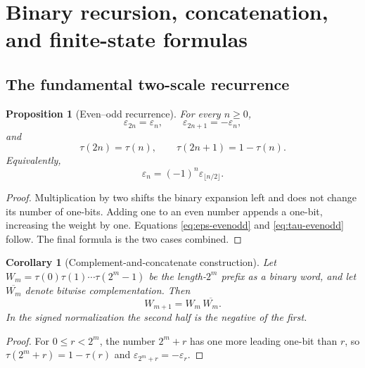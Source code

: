 \documentclass[11pt,oneside]{article}
\newtheorem{proposition}[theorem]{Proposition}
\newtheorem{corollary}[theorem]{Corollary}
\theoremstyle{definition}
\theoremstyle{remark}
\newcommand{\eps}{\varepsilon}
\newcommand{\1}{\mathbf 1}
\begin{document}
\section{Binary recursion, concatenation, and finite-state formulas}
\label{sec:binary}

\subsection{The fundamental two-scale recurrence}

\begin{proposition}[Even--odd recurrence]
\label{prop:evenodd}
For every \(n\ge0\),
\begin{equation}
 \eps_{2n}=\eps_n,
 \qquad
 \eps_{2n+1}=-\eps_n,
 \label{eq:eps-evenodd}
\end{equation}
and
\begin{equation}
 \tau(2n)=\tau(n),
 \qquad
 \tau(2n+1)=1-\tau(n).
 \label{eq:tau-evenodd}
\end{equation}
Equivalently,
\begin{equation}
 \eps_n=(-1)^n\eps_{\lfloor n/2\rfloor}.
 \label{eq:one-line-recursion}
\end{equation}
\end{proposition}

\begin{proof}
Multiplication by two shifts the binary expansion left and does not change its number of
one-bits.  Adding one to an even number appends a one-bit, increasing the weight by one.
Equations \eqref{eq:eps-evenodd} and \eqref{eq:tau-evenodd} follow.  The final formula is the
two cases combined.
\end{proof}

\begin{corollary}[Complement-and-concatenate construction]
\label{cor:morphism}
Let \(W_m=\tau(0)\tau(1)\cdots\tau(2^m-1)\) be the length-\(2^m\) prefix as a binary word,
and let \(\overline{W_m}\) denote bitwise complementation.  Then
\begin{equation}
 W_{m+1}=W_m\,\overline{W_m}.
 \label{eq:morphism-concat}
\end{equation}
In the signed normalization the second half is the negative of the first.
\end{corollary}

\begin{proof}
For \(0\le r<2^m\), the number \(2^m+r\) has one more leading one-bit than \(r\), so
\(\tau(2^m+r)=1-\tau(r)\) and \(\eps_{2^m+r}=-\eps_r\).
\end{proof}
\end{document}

